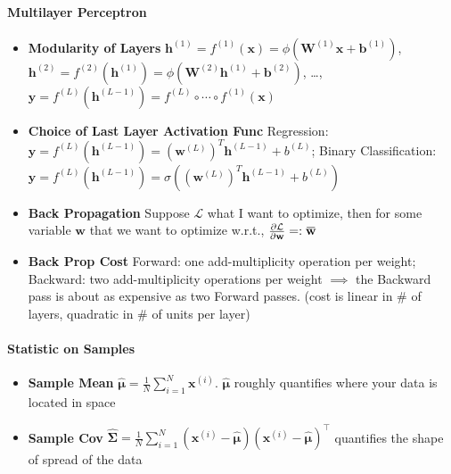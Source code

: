 \documentclass[10pt]{article}
\newcommand{\overbar}[1]{\mkern 1.5mu\overline{\mkern-1.5mu#1\mkern-1.5mu}\mkern 1.5mu}
\newcommand{\bw}{\mathbf{w}}
\begin{document}
\paragraph{Multilayer Perceptron} 
\begin{itemize}
    \setlength\itemsep{-0.45em}
    \item \textbf{Modularity of Layers} $\mathbf{h}^{(1)}=f^{(1)}(\mathbf{x})=\phi\left(\mathbf{W}^{(1)} \mathbf{x}+\mathbf{b}^{(1)}\right)$, $\mathbf{h}^{(2)}=f^{(2)}\left(\mathbf{h}^{(1)}\right)=\phi\left(\mathbf{W}^{(2)} \mathbf{h}^{(1)}+\mathbf{b}^{(2)}\right)$, \dots, $\mathbf{y}=f^{(L)}\left(\mathbf{h}^{(L-1)}\right) = f^{(L)} \circ \cdots \circ f^{(1)}(\mathbf{x})$
    \item \textbf{Choice of Last Layer Activation Func} Regression: $\mathbf{y}=f^{(L)}\left(\mathbf{h}^{(L-1)}\right)=\left(\mathbf{w}^{(L)}\right)^{T} \mathbf{h}^{(L-1)}+b^{(L)}$; Binary Classification: $\mathbf{y}=f^{(L)}\left(\mathbf{h}^{(L-1)}\right)=\sigma\left(\left(\mathbf{w}^{(L)}\right)^{T} \mathbf{h}^{(L-1)}+b^{(L)}\right)$
    \item \textbf{Back Propagation} Suppose $\mathcal{L}$ what I want to optimize, then for some variable $\bw$ that we want to optimize w.r.t., $\frac{\partial \mathcal{L}}{\partial \bw} =: \overbar{\bw}$
    \item \textbf{Back Prop Cost} Forward: one add-multiplicity operation per weight; Backward: two add-multiplicity operations per weight $\implies$ the Backward pass is about as expensive as two Forward passes. (cost is linear in \# of layers, quadratic in \# of units per layer)
\end{itemize}



\paragraph{Statistic on Samples}
\begin{itemize}
	\setlength\itemsep{-0.45em}
	\item \textbf{Sample Mean} $\hat{\boldsymbol{\mu}}=\frac{1}{N} \sum_{i=1}^{N} \mathbf{x}^{(i)}$. $\hat{\boldsymbol{\mu}}$ roughly quantifies where your data is located in space
	\item \textbf{Sample Cov} $\hat{\mathbf{\Sigma}}=\frac{1}{N} \sum_{i=1}^{N}\left(\mathbf{x}^{(i)}-\hat{\boldsymbol{\mu}}\right)\left(\mathbf{x}^{(i)}-\hat{\boldsymbol{\mu}}\right)^{\top}$ quantifies the shape of spread of the data
\end{itemize}
\end{document}
